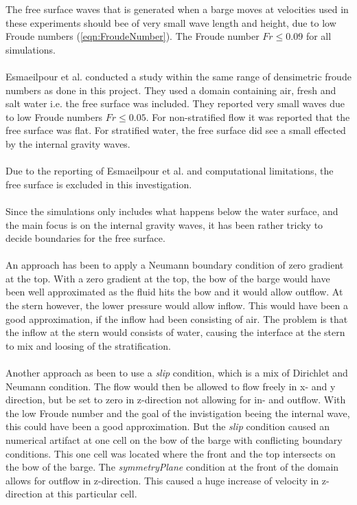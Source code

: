 \documentclass[a4paper, 12pt]{report}
\begin{document}
The free surface waves that is generated when a barge moves at velocities used in these experiments should bee of very small wave length and height, due to low Froude numbers (\ref{eqn:FroudeNumber}). The Froude number $Fr \leq 0.09 $ for all simulations.\\
\\
Esmaeilpour et al. \cite{Esmaeilpour} conducted a study within the same range of densimetric froude numbers as done in this project. They used a domain containing air, fresh and salt water i.e. the free surface was included. They reported very small waves  due to low Froude numbers $Fr \leq 0.05$. For non-stratified flow it was reported that the free surface was flat. For stratified water, the free surface did see a small effected by the internal gravity waves.\\
\\
Due to the reporting of Esmaeilpour et al. and computational limitations, the free surface is excluded in this investigation.\\
\\
Since the simulations only includes what happens below the water surface, and the main focus is on the internal gravity waves, it has been rather tricky to decide boundaries for the free surface.\\
\\
An approach has been to apply a Neumann boundary condition of zero gradient at the top. With a zero gradient at the top, the bow of the barge would have been well approximated as the fluid hits the bow and it would allow outflow. At the stern however, the lower pressure would allow inflow. This would have been a good approximation, if the inflow had been consisting of air. The problem is that the inflow at the stern would consists of water, causing the interface at the stern to mix and loosing of the stratification. \\
\\
Another approach as been to use a \textit{slip} condition, which is a mix of Dirichlet and Neumann condition. The flow would then be allowed to flow freely in x- and y direction, but be set to zero in z-direction not allowing for in- and outflow.
With the low Froude number and the goal of the invistigation beeing the internal wave, this could have been a good approximation. But the \textit{slip} condition caused an numerical artifact at one cell on the bow of the barge with conflicting boundary conditions. This one cell was located where the front and the top intersects on the bow of the barge. The \textit{symmetryPlane} condition at the front of the domain allows for outflow in z-direction. This caused a huge increase of velocity in z-direction at this particular cell. \\
\end{document}
